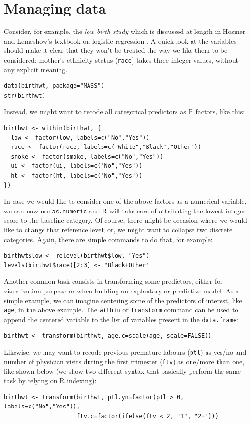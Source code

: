 \documentclass[a4paper,twoside]{book}
\renewcommand{\texttt}[1]{\lstinline{#1}}
\newcommand{\R}{\textsf{R}\xspace}
\begin{document}
\section{Managing data}
Consider, for example, the \emph{low birth study} which is discussed
at length in Hosmer and Lemeshow's textbook on logistic regression
\autocite{hosmer89}. A quick look at the variables should make it
clear that they won't be treated the way we like them to be
considered: mother's ethnicity status (\texttt{race}) takes three
integer values, without any explicit meaning.

\begin{verbatim}
data(birthwt, package="MASS")
str(birthwt)
\end{verbatim}

Instead, we might want to recode all categorical predictors as \R
factors, like this:
\begin{verbatim}
birthwt <- within(birthwt, {
  low <- factor(low, labels=c("No","Yes"))
  race <- factor(race, labels=c("White","Black","Other"))
  smoke <- factor(smoke, labels=c("No","Yes"))
  ui <- factor(ui, labels=c("No","Yes"))
  ht <- factor(ht, labels=c("No","Yes"))
})
\end{verbatim}

In case we would like to consider one of the above factors as a
numerical variable, we can now use \texttt{as.numeric} and \R will
take care of attributing the lowest integer score to the baseline
category. Of course, there might be occasion where we would like to
change that reference level; or, we might want to collapse two
discrete categories. Again, there are simple commands to do that, for
example:
\begin{verbatim}
birthwt$low <- relevel(birthwt$low, "Yes")
levels(birthwt$race)[2:3] <- "Black+Other"
\end{verbatim}

Another common task consists in transforming some predictors, either
for visualization purpose or when building an explantory or predictive
model. As a simple example, we can imagine centering some of the
predictors of interest, like \texttt{age}, in the above example. The
\texttt{within} or \texttt{transform} command can be used to append
the centered variable to the list of variables present in the
\texttt{data.frame}:
\begin{verbatim}
birthwt <- transform(birthwt, age.c=scale(age, scale=FALSE))
\end{verbatim}

Likewise, we may want to recode previous premature labours
(\texttt{ptl}) as yes/no and number of physician visits during the
first trimester (\texttt{ftv}) as one/more than one, like shown below
(we show two different syntax that basically perform the same task by
relying on \R indexing):
\begin{verbatim}
birthwt <- transform(birthwt, ptl.yn=factor(ptl > 0, labels=c("No","Yes")), 
                     ftv.c=factor(ifelse(ftv < 2, "1", "2+")))
\end{verbatim}
\end{document}
